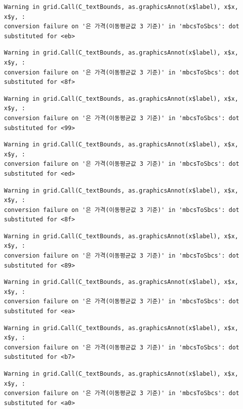 \documentclass[
  letterpaper,
  DIV=11,
  numbers=noendperiod]{scrreprt}
\begin{document}
\begin{verbatim}
Warning in grid.Call(C_textBounds, as.graphicsAnnot(x$label), x$x, x$y, :
conversion failure on '은 가격(이동평균값 3 기준)' in 'mbcsToSbcs': dot
substituted for <eb>
\end{verbatim}

\begin{verbatim}
Warning in grid.Call(C_textBounds, as.graphicsAnnot(x$label), x$x, x$y, :
conversion failure on '은 가격(이동평균값 3 기준)' in 'mbcsToSbcs': dot
substituted for <8f>
\end{verbatim}

\begin{verbatim}
Warning in grid.Call(C_textBounds, as.graphicsAnnot(x$label), x$x, x$y, :
conversion failure on '은 가격(이동평균값 3 기준)' in 'mbcsToSbcs': dot
substituted for <99>
\end{verbatim}

\begin{verbatim}
Warning in grid.Call(C_textBounds, as.graphicsAnnot(x$label), x$x, x$y, :
conversion failure on '은 가격(이동평균값 3 기준)' in 'mbcsToSbcs': dot
substituted for <ed>
\end{verbatim}

\begin{verbatim}
Warning in grid.Call(C_textBounds, as.graphicsAnnot(x$label), x$x, x$y, :
conversion failure on '은 가격(이동평균값 3 기준)' in 'mbcsToSbcs': dot
substituted for <8f>
\end{verbatim}

\begin{verbatim}
Warning in grid.Call(C_textBounds, as.graphicsAnnot(x$label), x$x, x$y, :
conversion failure on '은 가격(이동평균값 3 기준)' in 'mbcsToSbcs': dot
substituted for <89>
\end{verbatim}

\begin{verbatim}
Warning in grid.Call(C_textBounds, as.graphicsAnnot(x$label), x$x, x$y, :
conversion failure on '은 가격(이동평균값 3 기준)' in 'mbcsToSbcs': dot
substituted for <ea>
\end{verbatim}

\begin{verbatim}
Warning in grid.Call(C_textBounds, as.graphicsAnnot(x$label), x$x, x$y, :
conversion failure on '은 가격(이동평균값 3 기준)' in 'mbcsToSbcs': dot
substituted for <b7>
\end{verbatim}

\begin{verbatim}
Warning in grid.Call(C_textBounds, as.graphicsAnnot(x$label), x$x, x$y, :
conversion failure on '은 가격(이동평균값 3 기준)' in 'mbcsToSbcs': dot
substituted for <a0>
\end{verbatim}
\end{document}
